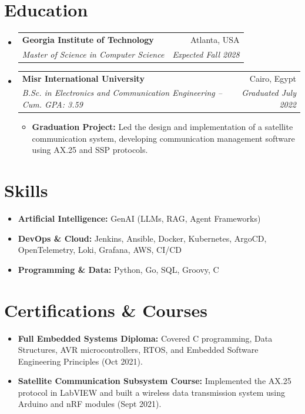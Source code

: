 \documentclass[letterpaper,11pt]{article}
\makeatletter
\newcommand{\resumeItem}[1]{
  \item\small{
    {#1 \vspace{-2pt}}
  }
}
\newcommand{\resumeSubheading}[4]{
  \vspace{-1pt}\item
    \begin{tabular*}{0.97\textwidth}[t]{l@{\extracolsep{\fill}}r}
      \textbf{#1} & #2 \\
      \textit{\small#3} & \textit{\small #4} \\
    \end{tabular*}\vspace{-5pt}
}
\newcommand{\resumeSubItem}[1]{\resumeItem{#1}\vspace{-4pt}}
\newcommand{\resumeSubHeadingListStart}{\begin{itemize}[leftmargin=*]}
\newcommand{\resumeSubHeadingListEnd}{\end{itemize}}
\newcommand{\resumeItemListStart}{\begin{itemize}}
\newcommand{\resumeItemListEnd}{\end{itemize}\vspace{-5pt}}
\makeatother
\begin{document}
\section{Education}
  \resumeSubHeadingListStart
    \resumeSubheading
      {Georgia Institute of Technology}{Atlanta, USA}
      {Master of Science in Computer Science}{Expected Fall 2028}

    \resumeSubheading
      {Misr International University}{Cairo, Egypt}
      {B.Sc. in Electronics and Communication Engineering -- Cum. GPA: 3.59}{Graduated July 2022}
      \resumeItemListStart
        \resumeItem{\textbf{Graduation Project:} Led the design and implementation of a satellite communication system, developing communication management software using AX.25 and SSP protocols.}
      \resumeItemListEnd
  \resumeSubHeadingListEnd

\section{Skills}
 \resumeSubHeadingListStart
    \resumeItem{\textbf{Artificial Intelligence:} GenAI (LLMs, RAG, Agent Frameworks)}
    \resumeItem{\textbf{DevOps \& Cloud:} Jenkins, Ansible, Docker, Kubernetes, ArgoCD, OpenTelemetry, Loki, Grafana, AWS, CI/CD}
    \resumeItem{\textbf{Programming \& Data:} Python, Go, SQL, Groovy, C}
 \resumeSubHeadingListEnd

\section{Certifications \& Courses}
  \resumeSubHeadingListStart
    \resumeSubItem{\textbf{Full Embedded Systems Diploma:} Covered C programming, Data Structures, AVR microcontrollers, RTOS, and Embedded Software Engineering Principles (Oct 2021).}
    \resumeSubItem{\textbf{Satellite Communication Subsystem Course:} Implemented the AX.25 protocol in LabVIEW and built a wireless data transmission system using Arduino and nRF modules (Sept 2021).}
  \resumeSubHeadingListEnd
\end{document}
